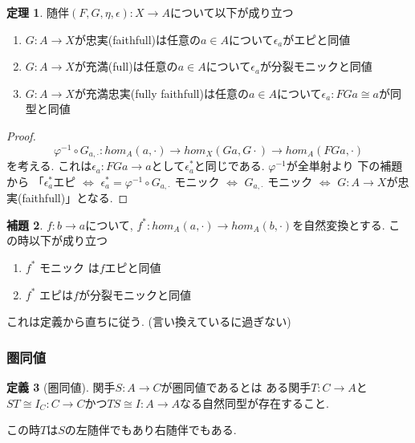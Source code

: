 \documentclass[dvipdfmx,a4paper,11pt]{article}
\theoremstyle{definition}
\newtheorem{thm}{定理}
\newtheorem{lem}[thm]{補題}
\newtheorem{dfn}[thm]{定義}
\begin{document}
 \begin{tcolorbox}
 [colback = white, colframe = green!35!black, fonttitle = \bfseries,breakable = true]
\begin{thm}
\label{thm-adjoint-fullyfaithfull}
随伴$(F,G,\eta,\epsilon): X \to A$について以下が成り立つ
\begin{enumerate}
\item $G : A \to X$が忠実(faithfull)は任意の$a \in A$について$\epsilon_a$がエピと同値
\item $G : A \to X$が充満(full)は任意の$a \in A$について$\epsilon_a$が分裂モニックと同値
\item $G : A \to X$が充満忠実(fully faithfull)は任意の$a \in A$について$\epsilon_a : FG a \cong a$が同型と同値
\end{enumerate}
\end{thm}
\end{tcolorbox}
\begin{proof}
$$
\varphi^{-1} \circ G_{a, \cdot}:
hom_{A}(a, \cdot)
\to 
hom_{X}(Ga, G\cdot)
\to 
hom_{A}(FGa, \cdot)
$$
を考える. これは$\epsilon_a : FGa \to a$として$\epsilon_{a}^{*}$と同じである.
$\varphi^{-1}$が全単射より 
下の補題から
「$\epsilon_{a}^{*}$エピ $\Leftrightarrow$ $\epsilon_{a}^{*} = \varphi^{-1} \circ G_{a, \cdot}$ モニック
$\Leftrightarrow$ $ G_{a, \cdot}$ モニック $\Leftrightarrow$ $G : A \to X$が忠実(faithfull)」となる.
\end{proof}
\begin{tcolorbox}
 [colback = white, colframe = green!35!black, fonttitle = \bfseries,breakable = true]
\begin{lem}
$f: b \to a$について, $f^{*} : hom_{A} (a, \cdot) \to hom_{A}(b, \cdot)$を自然変換とする. 
この時以下が成り立つ
\begin{enumerate}
\item $f^{*}$ モニック は$f$エピと同値
\item $f^{*}$ エピは$f$が分裂モニックと同値
\end{enumerate}
\end{lem}
\end{tcolorbox}
これは定義から直ちに従う. (言い換えているに過ぎない)

\subsubsection{圏同値}
 \begin{tcolorbox}
 [colback = white, colframe = green!35!black, fonttitle = \bfseries,breakable = true]
\begin{dfn}[圏同値]
関手$S : A \to C$が圏同値であるとは
ある関手$T : C \to A$と$ST \cong I_{C} : C \to C$かつ$TS \cong I : A \to A$なる自然同型が存在すること.

この時$T$は$S$の左随伴でもあり右随伴でもある. 
\end{dfn}
\end{tcolorbox}
\end{document}
